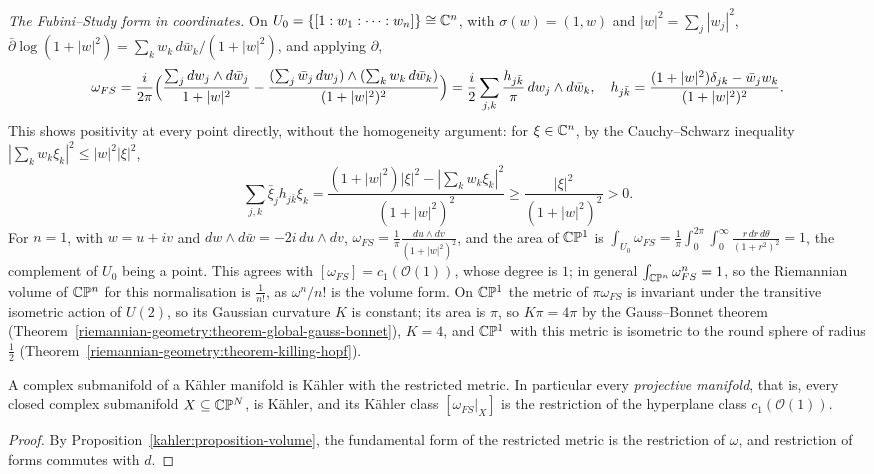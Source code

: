 \begin{example}\label{kahler:example-fubini-study-explicit}
\emph{The Fubini--Study form in coordinates.} On $U_0 = \{[1 : w_1 : \cdots : w_n]\} \cong \mathbb{C}^n$, with $\sigma(w) = (1, w)$ and $|w|^2 = \sum_j|w_j|^2$,
$\bar\partial\log(1 + |w|^2) = \sum_kw_k\,d\bar w_k/(1 + |w|^2)$, and applying $\partial$,
\[
\omega_{FS} = \frac{i}{2\pi}\Bigl(\frac{\sum_jdw_j \wedge d\bar w_j}{1 + |w|^2} - \frac{(\sum_j\bar w_j\,dw_j) \wedge (\sum_kw_k\,d\bar w_k)}{(1 + |w|^2)^2}\Bigr)
= \frac{i}{2}\sum_{j,k}\frac{h_{j\bar k}}{\pi}\,dw_j \wedge d\bar w_k, \quad h_{j\bar k} = \frac{(1 + |w|^2)\delta_{jk} - \bar w_jw_k}{(1 + |w|^2)^2}.
\]
This shows positivity at every point directly, without the homogeneity argument: for $\xi \in \mathbb{C}^n$, by the Cauchy--Schwarz inequality $|\sum_kw_k\xi_k|^2 \leq |w|^2|\xi|^2$,
\[
\sum_{j,k}\bar\xi_jh_{j\bar k}\xi_k = \frac{(1 + |w|^2)|\xi|^2 - |\sum_kw_k\xi_k|^2}{(1 + |w|^2)^2} \geq \frac{|\xi|^2}{(1 + |w|^2)^2} > 0 .
\]
For $n = 1$, with $w = u + iv$ and $dw \wedge d\bar w = -2i\,du \wedge dv$, $\omega_{FS} = \frac1\pi\frac{du \wedge dv}{(1 + |w|^2)^2}$, and the area of $\mathbb{C}\mathbb{P}^1$ is
$\int_{U_0}\omega_{FS} = \frac1\pi\int_0^{2\pi}\int_0^\infty\frac{r\,dr\,d\theta}{(1 + r^2)^2} = 1$, the complement of $U_0$ being a point. This agrees with $[\omega_{FS}] = c_1(\mathcal{O}(1))$, whose degree is
$1$; in general $\int_{\mathbb{C}\mathbb{P}^n}\omega_{FS}^n = 1$, so the Riemannian volume of $\mathbb{C}\mathbb{P}^n$ for this normalisation is $\frac1{n!}$, as $\omega^n/n!$ is the volume form. On $\mathbb{C}\mathbb{P}^1$ the metric of
$\pi\omega_{FS}$ is invariant under the transitive isometric action of $U(2)$, so its Gaussian curvature $K$ is constant; its area is $\pi$, so $K\pi = 4\pi$ by the Gauss--Bonnet theorem
(Theorem~\ref{riemannian-geometry:theorem-global-gauss-bonnet}), $K = 4$, and $\mathbb{C}\mathbb{P}^1$ with this metric is isometric to the round sphere of radius $\frac12$
(Theorem~\ref{riemannian-geometry:theorem-killing-hopf}).
\end{example}

\begin{corollary}\label{kahler:corollary-projective-kahler}
A complex submanifold of a K\"ahler manifold is K\"ahler with the restricted metric. In particular every \emph{projective manifold}, that is,
every closed complex submanifold $X \subseteq \mathbb{C}\mathbb{P}^N$, is K\"ahler, and its K\"ahler class $[\omega_{FS}|_X]$ is the restriction of the
hyperplane class $c_1(\mathcal{O}(1))$.
\end{corollary}

\begin{proof}
By Proposition~\ref{kahler:proposition-volume}, the fundamental form of the restricted metric is the restriction of $\omega$, and restriction
of forms commutes with $d$.
\end{proof}

